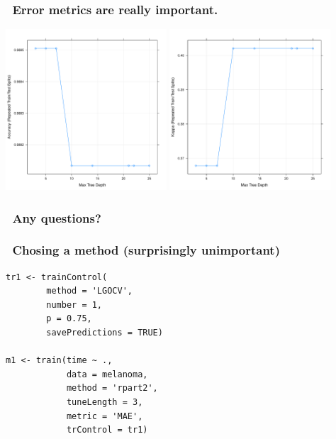 \documentclass[handout, aspectratio = 169]{beamer}
\begin{document}
\begin{frame}
\frametitle{\insertframenumber~Error metrics are really important.}

    \includegraphics[width = 0.45\textwidth]{rpart_acc.pdf}%
    \includegraphics[width = 0.45\textwidth]{rpart_kappa.pdf}

\end{frame} 


\begin{frame}
\frametitle{\insertframenumber~Any questions?}


\end{frame} 





\begin{frame}[fragile]
\frametitle{\insertframenumber~Chosing a method (surprisingly unimportant)}
\renewcommand{\FancyVerbFormatLine}[1]{%
   \ifnum\value{FancyVerbLine}=9\color{cyan}#1%
   \else #1\fi}
\begin{Verbatim}
tr1 <- trainControl(
        method = 'LGOCV',
        number = 1,
        p = 0.75,
        savePredictions = TRUE)

m1 <- train(time ~ ., 
            data = melanoma,
            method = 'rpart2',
            tuneLength = 3,
            metric = 'MAE',
            trControl = tr1)
            
\end{Verbatim}

\end{frame} 
\end{document}

